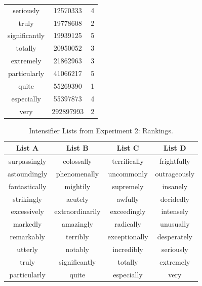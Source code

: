 \documentclass[10pt,letterpaper]{article}
\begin{document}
\begin{table}[ht]
\begin{center}
\begin{tabular}{ccc}
    seriously & 12570333 & 4 \\
    truly & 19778608 & 2 \\
    significantly & 19939125 & 5 \\
    totally & 20950052 & 3 \\
    extremely & 21862963 & 3 \\
    particularly & 41066217 & 5 \\
    quite & 55269390 & 1 \\
    especially & 55397873 & 4 \\
    very & 292897993 & 2
  \end{tabular}
 \end{center}
\end{table}


\begin{table}[ht]
\begin{center} 
\caption{Intensifier Lists from Experiment 2: Rankings.} 
\label{exp2-intensifiers} 
\vskip 0.12in
\begin{tabular}{cccc} 
\hline
List A    &  List B & List C & List D \\
\hline
surpassingly & colossally & terrifically & frightfully \\
astoundingly & phenomenally & uncommonly & outrageously \\
fantastically & mightily & supremely & insanely \\
strikingly & acutely & awfully & decidedly \\
excessively & extraordinarily & exceedingly & intensely \\
markedly & amazingly & radically & unusually \\
remarkably & terribly & exceptionally & desperately \\
utterly & notably & incredibly & seriously \\
truly & significantly & totally & extremely \\
particularly & quite & especially & very
\end{tabular}
\end{center}
\end{table}



\setlength{\bibleftmargin}{.125in}
\setlength{\bibindent}{-\bibleftmargin}


\end{document}
